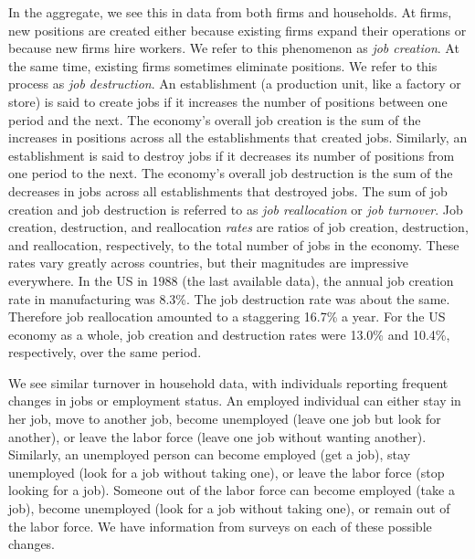 \documentclass[letterpaper,12pt]{article}
\begin{document}
In the aggregate, 
we see this in data from both firms and households.  
At firms, new positions are created either because existing firms
expand their operations or because new firms hire workers. We
refer to this phenomenon as \textit{job creation}. At the same
time, existing firms sometimes eliminate positions.  We refer to
this process as \textit{job destruction}.  An establishment (a
production unit, like a factory or store) is said to create
jobs if it increases the number of positions between one period
and the next.  The economy's overall job creation is the sum of
the increases in positions across all the establishments that
created jobs.  Similarly, an establishment is said to destroy jobs
if it decreases its number of positions from one period to the
next. The economy's overall job destruction is the sum of the
decreases in jobs across all establishments that destroyed jobs.
The sum of job creation and job destruction is referred to as
\textit{job reallocation} or \textit{job turnover}. Job creation,
destruction, and reallocation \textit{rates} are ratios of
job creation, destruction, and reallocation, respectively, to the
total number of jobs in the economy. These rates vary greatly
across countries, but their magnitudes are impressive everywhere.
In the US in 1988 (the last available data), 
the annual job creation rate in manufacturing
was 8.3\%. The job destruction rate was about the same. Therefore
job reallocation amounted to a staggering 16.7\% a year. For the
US economy as a whole, job creation and destruction rates were
13.0\% and 10.4\%, respectively, over the same period.

We see similar turnover in household data, 
with individuals reporting frequent changes in jobs 
or employment status.  
An employed individual can either stay in her job, move to another
job, become unemployed (leave one job but look for another), or
leave the labor force (leave one job without wanting another).
Similarly, an unemployed person can become employed (get a job),
stay unemployed (look for a job without taking one), or leave the
labor force (stop looking for a job).  Someone out of the labor
force can become employed (take a job), become unemployed (look
for a job without taking one), or remain out of the labor force.
We have information from surveys on each of these possible
changes.
\end{document}
